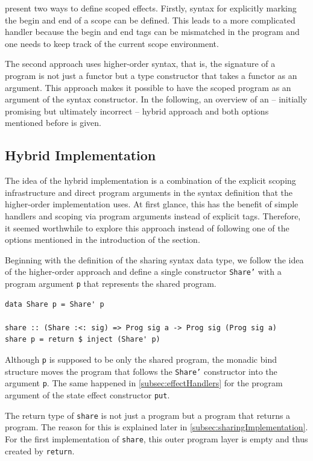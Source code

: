 \documentclass[a4paper, 11pt, fleqn, twoside, abstract=on]{scrreprt}
\newcommand{\hinl}[1]{\texttt{#1}}
\begin{document}
\citet{wu2014effect} present two ways to define scoped effects.
Firstly, syntax for explicitly marking the begin and end of a scope can be defined.
This leads to a more complicated handler because the begin and end tags can be mismatched in the program and one needs to keep track of the current scope environment.

The second approach uses higher-order syntax, that is, the signature of a program is not just a functor but a type constructor that takes a functor as an argument.
This approach makes it possible to have the scoped program as an argument of the syntax constructor.
In the following, an overview of an  -- initially promising but ultimately incorrect  -- hybrid approach and both options mentioned before is given.

\subsection{Hybrid Implementation}

The idea of the hybrid implementation is a combination of the explicit scoping infrastructure and direct program arguments in the syntax definition that the higher-order implementation uses.
At first glance, this has the benefit of simple handlers and scoping via program arguments instead of explicit tags.
Therefore, it seemed worthwhile to explore this approach instead of following one of the options mentioned in the introduction of the section.

Beginning with the definition of the sharing syntax data type, we follow the idea of the higher-order approach and define a single constructor \hinl{Share'} with a program argument \hinl{p} that represents the shared program.

\begin{verbatim}
data Share p = Share' p

share :: (Share :<: sig) => Prog sig a -> Prog sig (Prog sig a)
share p = return $ inject (Share' p)
\end{verbatim}
Although \hinl{p} is supposed to be only the shared program, the monadic bind structure moves the program that follows the \hinl{Share'} constructor into the argument \hinl{p}.
The same happened in \autoref{subsec:effectHandlers} for the program argument of the state effect constructor \hinl{put}.

The return type of \hinl{share} is not just a program but a program that returns a program.
The reason for this is explained later in \autoref{subsec:sharingImplementation}.
For the first implementation of \hinl{share}, this outer program layer is empty and thus created by \hinl{return}.
\end{document}
